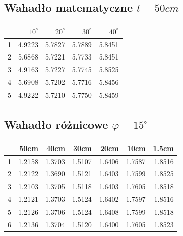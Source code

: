 \documentclass[a4paper,10pt]{article}
\begin{document}
\subsection{Wahadło matematyczne $l=50cm$}
\begin{tabular}{lrrrr}
\toprule
{} &    $10^\circ$ &     $20^\circ$ &      $30^\circ$ &      $40^\circ$\\
\midrule
1 &  4.9223 &  5.7827 &  5.7889 &  5.8451 \\
2 &  5.6868 &  5.7221 &  5.7733 &  5.8451 \\
3 &  4.9163 &  5.7227 &  5.7745 &  5.8525 \\
4 &  5.6908 &  5.7202 &  5.7716 &  5.8456 \\
5 &  4.9222 &  5.7210 &  5.7750 &  5.8459 \\
\bottomrule
\end{tabular}
\subsection{Wahadło różnicowe $\varphi = 15^\circ$}
\begin{tabular}{lrrrrrr}
\toprule
{} &      50cm &      40cm &      30cm &      20cm &      10cm &     1.5cm \\
\midrule
1 &  1.2158 &  1.3703 &  1.5107 &  1.6406 &  1.7587 &  1.8516 \\
2 &  1.2122 &  1.3690 &  1.5121 &  1.6403 &  1.7599 &  1.8525 \\
3 &  1.2103 &  1.3705 &  1.5118 &  1.6403 &  1.7605 &  1.8518 \\
4 &  1.2121 &  1.3703 &  1.5124 &  1.6402 &  1.7597 &  1.8516 \\
5 &  1.2126 &  1.3706 &  1.5124 &  1.6408 &  1.7599 &  1.8518 \\
6 &  1.2136 &  1.3704 &  1.5120 &  1.6400 &  1.7605 &  1.8523 \\
\bottomrule
\end{tabular}
\end{document}
